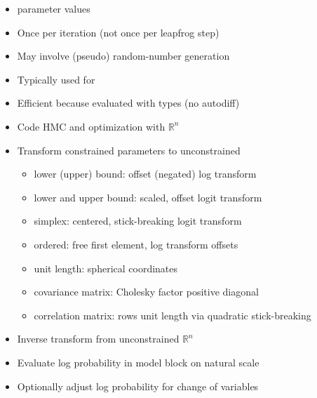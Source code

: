 \documentclass[10pt]{report}
\begin{document}
%
\begin{itemize}
\item {} parameter values
\item Once per iteration (not once per leapfrog step)
\item May involve (pseudo) random-number generation
\item Typically used for
\item Efficient because evaluated with  types (no autodiff)
\end{itemize}


%
\begin{itemize}
\item Code HMC and optimization with $\mathbb{R}^n$ 
\item Transform constrained parameters to unconstrained
  \vspace*{-2pt}
  {\small
    \begin{itemize}
    \item lower (upper) bound: offset (negated) log transform
    \item lower and upper bound: scaled, offset logit transform
    \item simplex: centered, stick-breaking logit transform
    \item ordered: free first element, log transform offsets
    \item unit length: spherical coordinates
    \item covariance matrix: Cholesky factor positive diagonal
    \item correlation matrix: rows unit length via quadratic stick-breaking
    \end{itemize}
  }
\end{itemize}


%
\begin{itemize}
\item Inverse transform from unconstrained $\mathbb{R}^n$
\item Evaluate log probability in model block on natural scale
\item Optionally adjust log probability for change of variables
\end{itemize}
\end{document}
